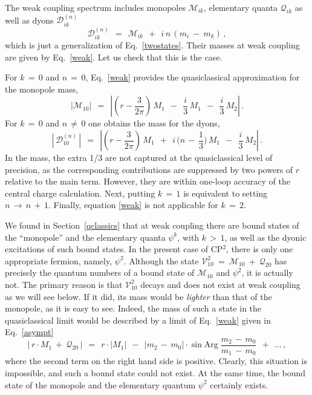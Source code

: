 \documentclass[epsfig,12pt]{article}
\def\beq{\begin{equation}}
\def\eeq{\end{equation}}
\def\beq{\begin{equation}}
\def\eeq{\end{equation}}
\newcommand{\M}{\mathcal{M}}
\newcommand{\Q}{\mathcal{Q}}
\newcommand{\D}{\mathcal{D}}
\newcommand{\V}{\mathcal{V}}
\begin{document}
	The weak coupling spectrum includes monopoles $ \M_{ik} $, elementary quanta $ \Q_{ik} $ 
	as well as dyons $ \D^{(n)}_{ik} $
\beq
	\D^{(n)}_{ik} ~~=~~ \M_{ik} ~~+~~ i\, n\, ( m_i ~-~ m_k ) \,,
\eeq
	which is just a generalization of Eq.~\eqref{twostates}.
	Their masses at weak coupling are given by Eq.~\eqref{weak}.
	Let us check that  this is the case.
	
	For $ k \,=\, 0 $ and $ n \,=\, 0 $, Eq.~\eqref{weak} provides the quasiclassical approximation for the monopole mass,
\beq
	| \M_{10} |  ~~=~~  \left|\left(r -\frac{3}{2\pi} \right)\, M_1 
	~~-~~ \frac{i}{3}\,  M_1 ~~-~~ \frac{i}{3}\,  M_2 \right|\,.
\eeq
	For $ k \,=\, 0 $ and $ n \,\neq\, 0 $ one obtains the mass for the dyons,
\beq
	\left|\, \D_{10}^{(n)} \,\right|  ~~=~~  \left|\left(r -\frac{3}{2\pi} \right)\, M_1  
		~~+~~  i\, \Big( n \,-\, \frac13 \Big)  \, M_1
		~~-~~ \frac{i}{3}\,  M_2  \right| \,.
\eeq
	In the mass, the extra 1/3 are not captured at the quasiclassical level of precision, 
	as the corresponding contributions are suppressed by two powers of $ r $ relative to the main term. 
	However, they are within one-loop accuracy of the central charge calculation.
	Next, putting $ k \,=\, 1 $ is equivalent to setting $ n \,\to\, n \,+\, 1 $.
	Finally, equation \eqref{weak} is not applicable for $ k \,=\, 2 $.

	We found in Section~\ref{qclassics} that at weak coupling there are
	bound states of the ``monopole'' and the elementary quanta $ \psi^k $, with $ k \,>\, 1 $,
	as well as the dyonic excitations of such bound states.
	In the present case of CP$^2$, there is only one appropriate fermion, namely, $ \psi^2 $. 
	Although the state $ \V_{10}^2 ~=~ \M_{10} ~+~ \Q_{20} $ has precisely the quantum numbers
	of a bound state of $ \M_{10} $ and $ \psi^2 $, it is actually not.
	The primary reason is that $ \V_{10}^2 $ decays and does not exist at weak coupling as we will see below.
	If it did, its mass would be \emph{lighter} than that of the monopole, as it is easy to see.
	Indeed, the mass of such a state in the quasiclassical limit would be described by a limit of Eq.~\eqref{weak}
	given in Eq.~\eqref{asympt}
\beq
       |\, r \cdot M_1  ~+~ \Q_{20} \,|  ~~=~~ r \cdot | M_1 |  ~~-~~ | m_2 \,-\, m_0 | \cdot \sin \text{Arg}\; \frac { m_2 \,-\, m_0 } 
                                                                                                                      { m_1 \,-\, m_0 }  
                                                                ~~+~~ ... \,,
\eeq
	where the second term on the right hand side is positive. 
	Clearly, this situation is impossible, and such a bound state could not exist. 
	At the same time, the bound state of the
	monopole and the elementary quantum $ \psi^2$ certainly exists.
\end{document}
